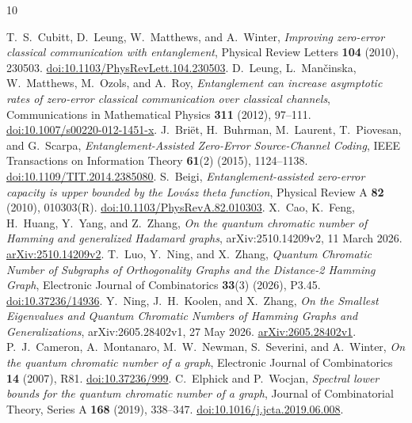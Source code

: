 \documentclass[11pt,a4paper]{article}
\numberwithin{equation}{section}
\numberwithin{figure}{section}
\numberwithin{table}{section}
\numberwithin{footnote}{section}
\theoremstyle{informal}\newtheorem*{informaltheorem}{Informal theorem}
\theoremstyle{definition}\newtheorem{example}{Example}[section]
\theoremstyle{remark}\newtheorem{remark}[theorem]{Remark}
\begin{document}
\begin{thebibliography}{10}
\raggedright
\small
\setlength{\itemsep}{2pt}
\setlength{\parsep}{0pt}
\setlength{\parskip}{0pt}
T.~S.~Cubitt, D.~Leung, W.~Matthews, and A.~Winter,
\emph{Improving zero-error classical communication with entanglement},
Physical Review Letters \textbf{104} (2010), 230503.
\href{https://doi.org/10.1103/PhysRevLett.104.230503}{doi:10.1103/PhysRevLett.104.230503}.
D.~Leung, L.~Man\v{c}inska, W.~Matthews, M.~Ozols, and A.~Roy,
\emph{Entanglement can increase asymptotic rates of zero-error classical
communication over classical channels},
Communications in Mathematical Physics \textbf{311} (2012), 97--111.
\href{https://doi.org/10.1007/s00220-012-1451-x}{doi:10.1007/s00220-012-1451-x}.
J.~Bri\"et, H.~Buhrman, M.~Laurent, T.~Piovesan, and G.~Scarpa,
\emph{Entanglement-Assisted Zero-Error Source-Channel Coding},
IEEE Transactions on Information Theory \textbf{61}(2) (2015), 1124--1138.
\href{https://doi.org/10.1109/TIT.2014.2385080}{doi:10.1109/TIT.2014.2385080}.
S.~Beigi,
\emph{Entanglement-assisted zero-error capacity is upper bounded by the
Lov\'asz theta function},
Physical Review A \textbf{82} (2010), 010303(R).
\href{https://doi.org/10.1103/PhysRevA.82.010303}{doi:10.1103/PhysRevA.82.010303}.
X.~Cao, K.~Feng, H.~Huang, Y.~Yang, and Z.~Zhang,
\emph{On the quantum chromatic number of Hamming and generalized
Hadamard graphs}, arXiv:2510.14209v2, 11 March 2026.
\href{https://arxiv.org/abs/2510.14209v2}{arXiv:2510.14209v2}.
T.~Luo, Y.~Ning, and X.~Zhang,
\emph{Quantum Chromatic Number of Subgraphs of Orthogonality Graphs
and the Distance-2 Hamming Graph},
Electronic Journal of Combinatorics \textbf{33}(3) (2026), P3.45.
\href{https://doi.org/10.37236/14936}{doi:10.37236/14936}.
Y.~Ning, J.~H.~Koolen, and X.~Zhang,
\emph{On the Smallest Eigenvalues and Quantum Chromatic Numbers of
Hamming Graphs and Generalizations}, arXiv:2605.28402v1, 27 May 2026.
\href{https://arxiv.org/abs/2605.28402v1}{arXiv:2605.28402v1}.
P.~J.~Cameron, A.~Montanaro, M.~W.~Newman, S.~Severini, and A.~Winter,
\emph{On the quantum chromatic number of a graph},
Electronic Journal of Combinatorics \textbf{14} (2007), R81.
\href{https://doi.org/10.37236/999}{doi:10.37236/999}.
C.~Elphick and P.~Wocjan,
\emph{Spectral lower bounds for the quantum chromatic number of a graph},
Journal of Combinatorial Theory, Series A \textbf{168} (2019), 338--347.
\href{https://doi.org/10.1016/j.jcta.2019.06.008}{doi:10.1016/j.jcta.2019.06.008}.

\end{thebibliography}
\end{document}
